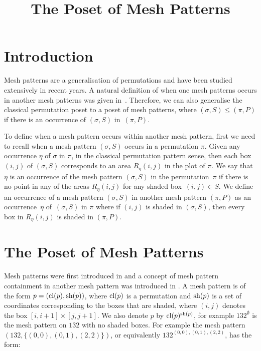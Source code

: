 \documentclass[11pt,a4paper,oneside]{article}
\title{The Poset of Mesh Patterns}
\begin{document}
	\maketitle


\section{Introduction}
Mesh patterns are a generalisation of permutations and have been studied extensively in recent years.
A natural definition of when one mesh patterns occurs in another mesh patterns was given in~\cite{TU17}.
Therefore, we can also generalise the classical permutation poset to a poset of mesh patterns, where 
$(\sigma,S)\le(\pi,P)$ if there is an occurrence of $(\sigma,S)$ in~$(\pi,P)$.

To define when a mesh pattern occurs within another mesh pattern, first we need to
recall when a mesh pattern $(\sigma,S)$ occurs in a permutation $\pi$. Given any 
occurrence $\eta$ of $\sigma$ in $\pi$, in the classical permutation pattern sense, 
then each box $(i,j)$ of $(\sigma,S)$ corresponds to an area $R_{\eta}(i,j)$ in the plot 
of $\pi$. We say that $\eta$ is an occurrence of the mesh pattern $(\sigma,S)$ in the 
permutation~$\pi$ if there is no point in any of the areas $R_{\eta}(i,j)$ for any shaded 
box~$(i,j)\in S$. We define an occurrence of a mesh pattern $(\sigma,S)$ in another mesh 
pattern $(\pi,P)$ as an occurrence~$\eta$ of~$(\sigma,S)$ in $\pi$ where if $(i,j)$ is shaded 
in $(\sigma,S)$, then every box in $R_\eta(i,j)$ is shaded in $(\pi,P)$.

\section{The Poset of Mesh Patterns}
Mesh patterns were first introduced in \cite{Bra11} and a concept of mesh
pattern containment in another mesh pattern was introduced in \cite{TU17}. A
mesh pattern is of the form $p=(\operatorname{\textrm{cl}}(p),\operatorname{\textrm{sh}}(p))$, where $\operatorname{\textrm{cl}}(p)$ is a permutation
and $\operatorname{\textrm{sh}}(p)$ is a set of coordinates corresponding to the boxes that are shaded,
where $(i,j)$ denotes the box $[i,i+1]\times[j,j+1]$. We
also denote $p$ by $\operatorname{\textrm{cl}}(p)^{\operatorname{\textrm{sh}}(p)}$, for example $132^\emptyset$ is the mesh
pattern on $132$ with no shaded boxes.  For example the mesh pattern
$(132,\{(0,0),(0,1),(2,2)\})$, or equivalently $132^{(0,0),(0,1),(2,2)}$, has the form:
\end{document}
